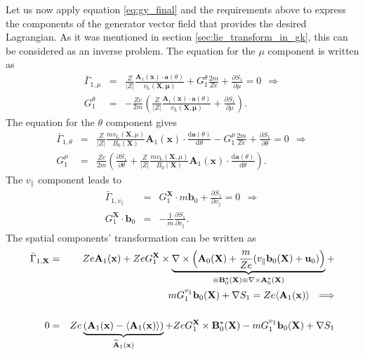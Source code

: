 \documentclass[a4paper,10pt]{article}
\newcommand{\st}[1]{\mathrm{#1}} %
\renewcommand{\vec}[1]{\mathbf{#1}}
\begin{document}
Let us now apply equation \ref{eq:gy_final} and the requirements above to express the components of the generator vector field that provides the desired Lagrangian. As it was mentioned in section \ref{sec:lie_transform_in_gk}, this can be considered as an inverse problem. The equation for the $\mu$ component is written as
\begin{eqnarray}
	\bar{\Gamma}_{1,\mu} &=& \frac{Z}{|Z|} \frac{\mathbf{A}_1(\mathbf{x}) \cdot \mathbf{a}(\theta)}{v_{\st{L}}(\mathbf{X,\mu})} + G_1^{\theta} \frac{2 m}{Z e} + \frac{\partial S_1}{\partial \mu} = 0 \ \ \Longrightarrow \nonumber \\
	G_1^{\theta} &=& - \frac{Z e}{2 m} \left( \frac{Z}{|Z|} \frac{\mathbf{A}_1(\mathbf{x}) \cdot \mathbf{a}(\theta)}{v_{\st{L}}(\mathbf{X,\mu})} + \frac{\partial S_1}{\partial \mu} \right).
\end{eqnarray}
The equation for the $\theta$ component gives
\begin{eqnarray}
	\bar{\Gamma}_{1,\theta} &=& \frac{Z}{|Z|} \frac{m v_{\st{L}}(\mathbf{X},\mu)}{B_0(\mathbf{X})} \mathbf{A}_1(\mathbf{x}) \cdot \frac{\mathrm{d}\mathbf{a}(\theta)}{\mathrm{d} \theta} - G_1^{\mu} \frac{2 m}{Z e} + \frac{\partial S_1}{\partial \theta} = 0 \ \ \Longrightarrow \nonumber \\
	G_1^{\mu} &=& \frac{Z e}{2 m} \left( \frac{\partial S_1}{\partial \theta} + \frac{Z}{|Z|} \frac{m v_{\st{L}}(\mathbf{X},\mu)}{B_0(\mathbf{X})} \mathbf{A}_1(\mathbf{x}) \cdot \frac{\mathrm{d}\mathbf{a}(\theta)}{\mathrm{d} \theta} \right).
\end{eqnarray}
The $v_{\parallel}$ component leads to
\begin{eqnarray}
	\bar{\Gamma}_{1,v_{\parallel}} &=& G_1^{\mathbf{X}} \cdot m \mathbf{b}_0 + \frac{\partial S_1}{\partial v_{\parallel}} = 0 \ \ \Longrightarrow \nonumber \\
	G_1^{\mathbf{X}} \cdot \mathbf{b}_0 &=& - \frac{1}{m} \frac{\partial S_1}{\partial v_{\parallel}}. \label{eq:G1X}
\end{eqnarray}
The spatial components' transformation can be written as
\begin{eqnarray}
	\bar{\Gamma}_{1,\mathbf{X}} &=& Z e \mathbf{A}_1(\mathbf{x}) + Z e G_1^{\mathbf{X}} \times \underbrace{\nabla \times \left( \mathbf{A}_0(\mathbf{X}) + \frac{m}{Z e} (v_{\parallel} \mathbf{b}_0(\mathbf{X})+\vec{u}_0)\right)}_{\equiv \mathbf{B}_0^{*}(\mathbf{X}) \equiv \nabla \times \mathbf{A}_0^{*}(\mathbf{X})} + \nonumber\\
	&& m G_1^{v_{\parallel}} \mathbf{b}_0(\mathbf{X}) + \nabla S_1 = Z e \langle \mathbf{A}_1(\mathbf{x}) \rangle \ \ \Longrightarrow \nonumber \\
	\noalign{\vskip 0.5 truecm}
	0 &=& Z e \underbrace{(\mathbf{A}_1(\mathbf{x}) - \langle \mathbf{A}_1(\mathbf{x})\rangle)}_{\widetilde{\mathbf{A}}_1(\mathbf{x})} + Z e G_1^{\mathbf{X}} \times \mathbf{B}_0^{*}(\mathbf{X}) - m G_1^{v_{\parallel}} \mathbf{b}_0(\mathbf{X}) + \nabla S_1 \label{eq:gamma_gy_X}
\end{eqnarray}
\end{document}
